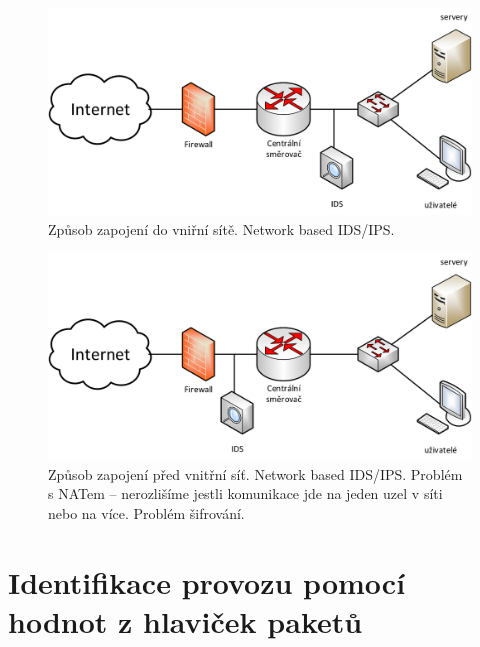 \begin{figure}[H]
    \centering
    \includegraphics[width=0.75\linewidth]{zpusob_zapojeni_1.png}
    \caption{Způsob zapojení do vniřní sítě. Network based IDS/IPS.}
\end{figure}

\begin{figure}[H]
    \centering
    \includegraphics[width=0.75\linewidth]{zpusob_zapojeni_2.png}
    \caption{Způsob zapojení před vnitřní síť. Network based IDS/IPS. Problém s NATem -- nerozlišíme jestli komunikace jde na jeden uzel v síti nebo na více. Problém šifrování.}
\end{figure}


\section{Identifikace provozu pomocí hodnot z hlaviček paketů}

